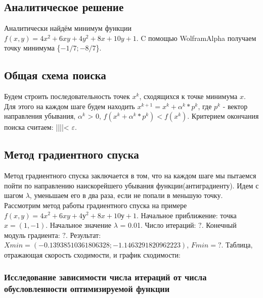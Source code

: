 \subsection{Аналитическое решение}\label{subsec:аналитическое-решение}
Аналитически найдём минимум функции {$f(x,y) = 4x^2 + 6xy + 4y^2 + 8x + 10y + 1$}.
\newline
C помощью WolframAlpha получаем точку минимума \{$-1/7;-8/7$\}.

\subsection{Общая схема поиска}\label{subsec:общая-схема-поиска}
Будем строить последовательность точек {$x^k$}, сходящихся к точке минимума $x$. \newline
Для этого на каждом шаге будем находить \newline
{$x^{k+1}=x^k+\alpha^{k}*p^k$}, где {$p^k$} - вектор направления убывания, {$\alpha^k$} > 0, \newline
{$f(x^k+\alpha^k*p^k) < f(x^k)$}.\newline
Критерием окончания поиска считаем: ||||< {$\varepsilon$}.
\newline

\subsection{Метод градиентного спуска}\label{subsec:метод-градиентного-спуска2}
Метод градиентного спуска заключается в том, что на каждом шаге мы пытаемся пойти по направлению наискорейшего убывания функции(антиградиенту).
Идем с шагом $\lambda$, уменьшаем его в два раза, если не попали в меньшую точку. \newline
Рассмотрим метод работы градиентного спуска на примере {$f(x,y) = 4x^2 + 6xy + 4у^2 + 8x + 10у + 1$}.
Начальное приближение: точка {$x = (1, -1)$}. \newline
Начальное значение $\lambda$ = 0.01. \newline
Число итераций: $?$. \newline
Конечный модуль градиента: $?$.\newline
Результат: $Xmin = (-0.13938510361806328; -1.1463291820962223)$, $Fmin = ?$.
\newline
\newline
Таблица, отражающая скорость сходимости, и график сходимости:

\subsubsection{Исследование зависимости числа итераций от числа обусловленности оптимизируемой функции}
\newline
\newline


